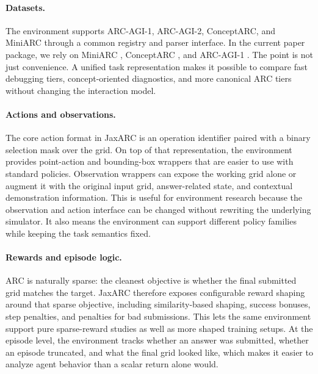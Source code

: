 \paragraph{Datasets.} The environment supports ARC-AGI-1, ARC-AGI-2, ConceptARC, and MiniARC through a common registry and parser interface. In the current paper package, we rely on MiniARC \citep{kimPlaygroundsAbstractionReasoning2022}, ConceptARC \citep{moskvichevConceptARCBenchmarkEvaluating2023}, and ARC-AGI-1 \citep{cholletMeasureIntelligence2019}. The point is not just convenience. A unified task representation makes it possible to compare fast debugging tiers, concept-oriented diagnostics, and more canonical ARC tiers without changing the interaction model.

\paragraph{Actions and observations.} The core action format in JaxARC is an operation identifier paired with a binary selection mask over the grid. On top of that representation, the environment provides point-action and bounding-box wrappers that are easier to use with standard policies. Observation wrappers can expose the working grid alone or augment it with the original input grid, answer-related state, and contextual demonstration information. This is useful for environment research because the observation and action interface can be changed without rewriting the underlying simulator. It also means the environment can support different policy families while keeping the task semantics fixed.

\paragraph{Rewards and episode logic.} ARC is naturally sparse: the cleanest objective is whether the final submitted grid matches the target. JaxARC therefore exposes configurable reward shaping around that sparse objective, including similarity-based shaping, success bonuses, step penalties, and penalties for bad submissions. This lets the same environment support pure sparse-reward studies as well as more shaped training setups. At the episode level, the environment tracks whether an answer was submitted, whether an episode truncated, and what the final grid looked like, which makes it easier to analyze agent behavior than a scalar return alone would.

